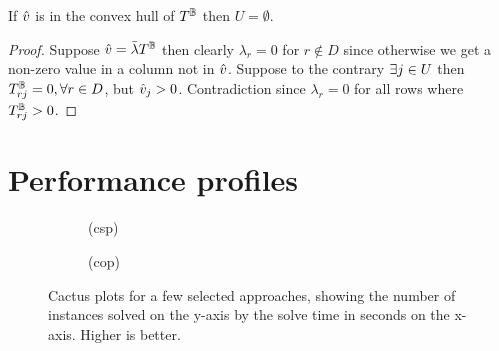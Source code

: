 \documentclass[a4paper,UKenglish,cleveref,autoref,thm-restate]{lipics-v2021}
\begin{document}
\setcounter{lemma}{15}
\begin{lemma}\label{lemma:hull}
    If $\hat{v}$ is in the convex hull of $T^{\mathbb{B}}$ then $U = \emptyset$.
    \begin{proof}
        Suppose $\hat{v} = \bar{\lambda} T^{\mathbb{B}}$ 
        then clearly $\lambda_r = 0$ for $r \not\in D$ since otherwise we get a non-zero value in a column not in $\hat{v}$. 
        Suppose to the contrary $\exists j \in U$ then $T^{\mathbb{B}}_{rj} = 0, \forall r \in D$, but $\hat{v}_j > 0$. Contradiction since $\lambda_r = 0$ for all rows where $T^{\mathbb{B}}_{rj} > 0$.
    \end{proof}
\end{lemma}

\section{Performance profiles}
\label{appendix:cactus}

\begin{figure}[h]
    \begin{subfigure}{\subfigureWidth}
        \centering
        
        \caption{\XCSPYears (\gls{csp})}
        \label{fig:cactus:csp}
    \end{subfigure}
    \begin{subfigure}{\subfigureWidth}
        \centering
        
        \caption{\XCSPYears (\gls{cop})}
        \label{fig:cactus:cop}
    \end{subfigure}
    \caption{Cactus plots for a few selected approaches, showing the number of instances solved on the y-axis by the solve time in seconds on the x-axis. Higher is better.}
    \label{fig:cactus}
\end{figure}
\end{document}
